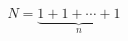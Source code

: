 \documentclass{article}
\begin{document}
\thispagestyle{empty}
\[
  N = \underbrace{1 + 1 + \cdots + 1}_n
\]
\end{document}
